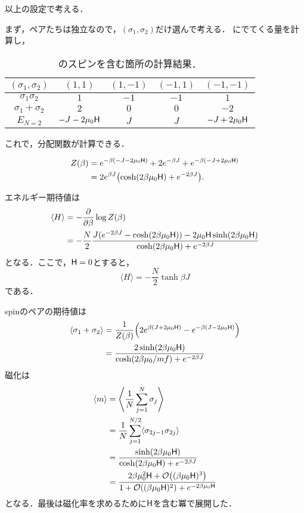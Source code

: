 	以上の設定で考える．

	まず，ペアたちは独立なので，$(\sigma_1, \sigma_2)$だけ選んで考える．
	にでてくる量を計算し，
	\begin{table}[tbp]
			\centering
			\label{tab:exchange_interaction}
			\caption{のスピンを含む箇所の計算結果．}
			\begin{tabular}{c|cccc}\hline
					$(\sigma_1, \sigma_2)$ & $(1, 1)$ & $(1, -1)$ & $(-1, 1)$ & $(-1, -1)$\\\hline
					$\sigma_1\sigma_2$ & $1$ & $-1$ & $-1$ & $1$\\
					$\sigma_1 + \sigma_2$ & $2$ & $0$ & $0$ & $-2$\\
					$E_{N=2}$ & $-J-2\mu_0\mathsf{H}$ & $J$ & $J$ & $-J+2\mu_0\mathsf{H}$\\\hline
			\end{tabular}
	\end{table}

	これで，分配関数が計算できる．

	\begin{align}
			Z(\beta) &= e^{-\beta(-J - 2\mu_0\mathsf{H})} + 2e^{-\beta J} + e^{-\beta(-J+2\mu_0\mathsf{H})}\\
					 &= 2e^{\beta J}\qty(\cosh(2\beta\mu_0 \mathsf{H}) + e^{-2\beta J}).
	\end{align}

	エネルギー期待値は
	\begin{align}
			\langle H \rangle &= -\pdv{}{\beta}\log Z(\beta)\\
							  &= -\frac{N}{2}\frac{J(e^{-2\beta J} - \cosh(2\beta\mu_0\mathsf{H})) - 2\mu_0\mathsf{H}\sinh(2\beta\mu_0 \mathsf{H})}{\cosh(2\beta\mu_0\mathsf{H}) + e^{-2\beta J}}
	\end{align}
	となる．ここで，$\mathsf{H} = 0$とすると，
	\begin{equation}
			\langle H \rangle = -\frac{N}{2}\tanh\beta J
	\end{equation}
	である．

	spinのペアの期待値は
	\begin{align}
			\langle \sigma_1 + \sigma_2\rangle &= \frac{1}{Z(\beta)}\qty(2e^{\beta(J + 2\mu_0\mathsf{H})} - e^{-\beta(J-2\mu_0\mathsf{H})})\\
										&= \frac{2\sinh(2\beta \mu_0 \mathsf{H})}{\cosh(2\beta\mu_0 /mf) + e^{-2\beta J}}
	\end{align}
	磁化は
	\begin{align}
			\langle m \rangle &= \left\langle \frac{1}{N}\sum_{j = 1}^{N}\sigma_j\right\rangle\\
							  &= \frac{1}{N}\sum_{j = 1}^{N/2}\langle \sigma_{2j-1}\sigma_{2j}\rangle\\
							  &= \frac{\sinh(2\beta\mu_0\mathsf{H})}{\cosh(2\beta\mu_0\mathsf{H}) + e^{-2\beta J}}\\
							  &= \frac{2\beta\mu_0^2\mathsf{H} + \mathcal{O}\qty((\beta\mu_0\mathsf{H})^3)}{1 + \mathcal{O}\qty((\beta\mu_0\mathsf{H})^2) + e^{-2\beta\mu_0\mathsf{H}}}
	\end{align}
	となる．最後は磁化率を求めるために$\mathsf{H}$を含む冪で展開した．

